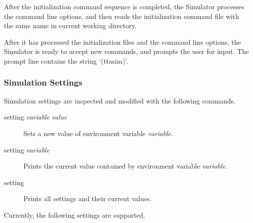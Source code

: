 \documentclass[twoside]{tceusermanual}
\begin{document}
After the initialization command sequence is completed, the
Simulator processes the command line options, and then reads the
initialization command file with the same name in current working directory.

After it has processed the initialization files and the command line options,
the Simulator is ready to accept new commands, and prompts the user for
input. The prompt line contains the string `(ttasim)'.

\subsubsection{Simulation Settings}
\label{ssec:debug-set}

Simulation settings are inspected and modified with the following commands.

\begin{description}
\item[setting \emph{variable} \emph{value}] %
  Sets a new value of environment variable \emph{variable}.
\item[setting \emph{variable}] %
  Prints the current value contained by environment variable
  \emph{variable}.
\item[setting] %
  Prints all settings and their current values. 
\end{description}

Currently, the following settings are supported.
\end{document}
